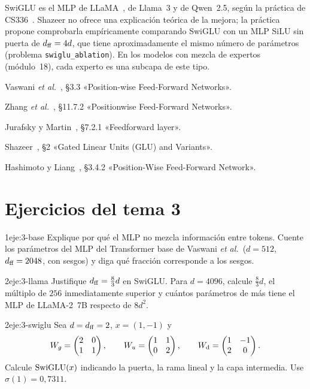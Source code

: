 \begin{observacion}
SwiGLU es el MLP de LLaMA~\cite[§2.2]{llama}, de Llama~3 y de Qwen~2.5, según la práctica de CS336~\cite[§3.4.2]{cs336}. Shazeer no ofrece una explicación teórica de la mejora; la práctica propone comprobarla empíricamente comparando SwiGLU con un MLP SiLU sin puerta de $d_{\mathrm{ff}}=4d$, que tiene aproximadamente el mismo número de parámetros (problema \texttt{swiglu\_ablation}). En los modelos con mezcla de expertos (módulo~18), cada experto es una subcapa de este tipo.
\end{observacion}

\begin{lecturas}
\item Vaswani \emph{et al.}~\cite{vaswani}, §3.3 «Position-wise Feed-Forward Networks».
\item Zhang \emph{et al.}~\cite{d2l}, §11.7.2 «Positionwise Feed-Forward Networks».
\item Jurafsky y Martin~\cite{jm3}, §7.2.1 «Feedforward layer».
\item Shazeer~\cite{shazeer}, §2 «Gated Linear Units (GLU) and Variants».
\item Hashimoto y Liang~\cite{cs336}, §3.4.2 «Position-Wise Feed-Forward Network».
\end{lecturas}

\section*{Ejercicios del tema 3}

\begin{ejercicio}{1}{eje:3-base}
Explique por qué el MLP no mezcla información entre tokens. Cuente los parámetros del MLP del Transformer base de Vaswani \emph{et al.}\ ($d=512$, $d_{\mathrm{ff}}=2048$, con sesgos) y diga qué fracción corresponde a los sesgos.
\end{ejercicio}

\begin{ejercicio}{2}{eje:3-llama}
Justifique $d_{\mathrm{ff}}=\frac83 d$ en SwiGLU. Para $d=4096$, calcule $\frac83 d$, el múltiplo de $256$ inmediatamente superior y cuántos parámetros de más tiene el MLP de LLaMA-2~7B respecto de $8d^{2}$.
\end{ejercicio}

\begin{ejercicio}{2}{eje:3-swiglu}
Sea $d=d_{\mathrm{ff}}=2$, $x=(1,-1)$ y
\[
W_g=\begin{pmatrix}2&0\\1&1\end{pmatrix},\qquad W_u=\begin{pmatrix}1&1\\0&2\end{pmatrix},\qquad W_{\mathrm{d}}=\begin{pmatrix}1&-1\\2&0\end{pmatrix}.
\]
Calcule $\operatorname{SwiGLU}(x)$ indicando la puerta, la rama lineal y la capa intermedia. Use $\sigma(1)=0{,}7311$.
\end{ejercicio}


